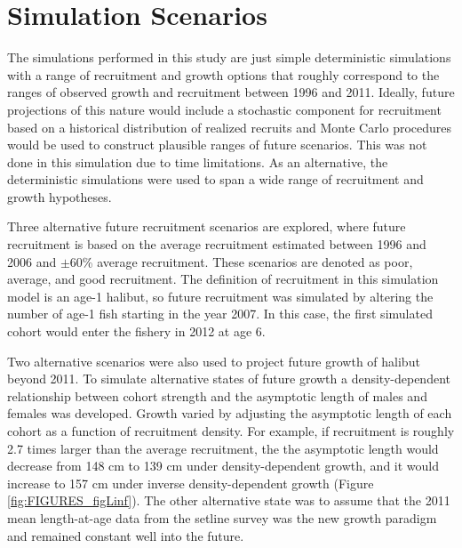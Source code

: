 

\section{Simulation Scenarios} %
\label{sec:simulation_scenarios}

The simulations performed in this study are just simple deterministic simulations with a range of recruitment and growth options that roughly correspond to the ranges of observed growth and recruitment between 1996 and 2011.  Ideally, future projections of this nature would include a stochastic component for recruitment based on a historical distribution of realized recruits and Monte Carlo procedures would be used to construct plausible ranges of future scenarios. This was not done in this simulation due to time limitations.  As an alternative, the deterministic simulations were used to span a wide range of recruitment and growth hypotheses.


Three alternative future recruitment scenarios are explored, where future recruitment is based on the average recruitment estimated between 1996 and 2006 and $\pm$60\% average recruitment.  These scenarios are denoted as poor, average, and good recruitment.  The definition of recruitment in this simulation model is an age-1 halibut, so future recruitment was simulated by altering the number of age-1 fish starting in the year 2007. In this case, the first simulated cohort would enter the fishery in 2012 at age 6.


Two alternative scenarios were also used to project future growth of halibut beyond 2011.  To simulate alternative states of future growth a density-dependent relationship between cohort strength and the asymptotic length of males and females was developed.  Growth varied by adjusting the asymptotic length of each cohort as a function of recruitment density. For example, if recruitment is roughly 2.7 times larger than the average recruitment, the the asymptotic length would decrease from 148 cm to 139 cm under density-dependent growth, and it would increase to 157 cm under inverse density-dependent growth (Figure \ref{fig:FIGURES_figLinf}).  The other alternative state was to assume that the 2011 mean length-at-age data from the setline survey was the new growth paradigm and remained constant well into the future. 


